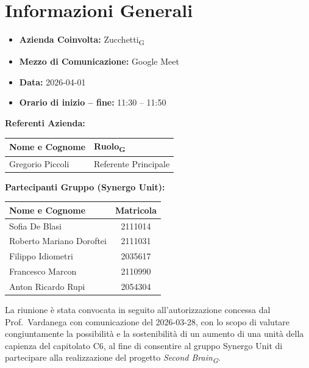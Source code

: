 \section{Informazioni Generali}
\begin{itemize}
	\item \textbf{Azienda Coinvolta:} {Zucchetti\textsubscript{G}}
	\item \textbf{Mezzo di Comunicazione:} {Google Meet}
	\item \textbf{Data:} 2026-04-01
	\item \textbf{Orario di inizio -- fine:} 11:30 -- 11:50
\end{itemize}


\vspace{0.5cm}
\textbf{Referenti Azienda:}
\begin{table}[ht]
	\centering
	\renewcommand{\arraystretch}{1.2}
	\begin{tabularx}{\textwidth}{X l}
		\toprule
		\textbf{Nome e Cognome} & \textbf{Ruolo\textsubscript{G}} \\
		\midrule
		{Gregorio Piccoli} & {Referente Principale} \\
		\bottomrule
	\end{tabularx}
\end{table}

\vspace{0.5cm}
\textbf{Partecipanti Gruppo (Synergo Unit):}
\begin{table}[ht]
	\centering
	\renewcommand{\arraystretch}{1.2}
	\begin{tabularx}{\textwidth}{X c}
		\toprule
		\textbf{Nome e Cognome} & \textbf{Matricola}\\
		\midrule
		Sofia De Blasi & 2111014 \\
		Roberto Mariano Doroftei & 2111031 \\
		Filippo Idiometri & 2035617 \\
		Francesco Marcon & 2110990 \\
		Anton Ricardo Rupi & 2054304 \\
		\bottomrule
	\end{tabularx}
\end{table}

\vspace{0.5cm}
 
La riunione è stata convocata in seguito all'autorizzazione concessa dal
Prof.\ Vardanega con comunicazione del 2026-03-28, con lo scopo di valutare
congiuntamente la possibilità e la sostenibilità di un aumento di una unità
della capienza del capitolato C6, al fine di consentire al gruppo Synergo Unit
di partecipare alla realizzazione del progetto \textit{Second Brain\textsubscript{G}}.
 
